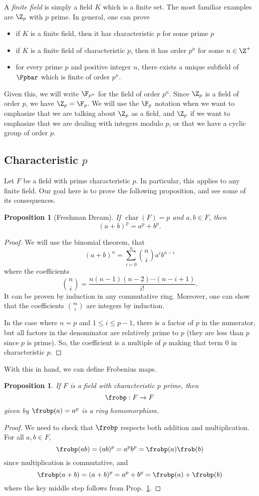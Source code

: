 \documentclass[12pt]{amsart}
\DeclareMathOperator{\chr}{char}
\theoremstyle{plain}
\newtheorem{prop}[thm]{Proposition}
\theoremstyle{definition}
\theoremstyle{remark}
\begin{document}
A \emph{finite field} is simply a field $K$ which is a finite set.
The most familiar examples are $\Z_p$ with $p$ prime.  In general,
one can prove
\begin{itemize}
\item if $K$ is a finite field, then it has characteristic $p$
 for some prime $p$
\item if $K$ is a finite field of characteristic $p$, then it
has order $p^n$ for some $n\in\Z^+$
\item for every prime $p$ and positive integer $n$, there exists a
  unique subfield of $\Fpbar$ which is finite of order $p^n$.
\end{itemize}
Given this, we will write $\F_{p^n}$ for the field of order $p^n$.
Since $\Z_p$ is a field of order $p$, we have $\Z_p=\F_p$.  We will
use the $\F_p$ notation when we want to emphasize that we are talking
about $\Z_p$ as a field, and $\Z_p$ if we want to emphasize that we
are dealing with integers modulo $p$, or that we have a cyclic group
of order $p$.

\subsection{Characteristic $p$}
Let $F$ be a field with prime characteristic $p$.  In particular, this
applies to any finite field.  Our goal here is to prove the following
proposition, and see some of its consequences.
\begin{prop}[Freshman Dream]
\label{dream}
If $\chr(F)=p$ and $a,b\in F$, then
\[ (a+b)^p=a^p+b^p.\]
\end{prop}
\begin{proof} 
We will use the binomial theorem, that
\[ (a+b)^n=\sum_{i=0}^n \binom{n}{i} a^ib^{n-i}\]
where the coefficients
\[ \binom{n}{i} = \frac{n(n-1)(n-2)\cdots(n-i+1)}{i!}.\]
It can be proven by induction in any commutative ring.  Moreover, one
can show that the coefficients $\binom m i$ are integers by induction.

In the case where $n=p$ and $1\leq i\leq p-1$, there is a factor of
$p$ in the numerator, but all factors in the denominator are
relatively prime to $p$ (they are less than $p$ since $p$ is prime).
So, the coefficient is a multiple of $p$ making that term $0$ in
characteristic $p$.
\end{proof}
With this in hand, we can define Frobenius maps.
\begin{prop}
  If $F$ is a field with characteristic $p$ prime, then
  \[ \frobp: F\to F\]
  given by $\frobp(a)=a^p$ is a ring homomorphism.
\end{prop}
\begin{proof}
  We need to check that $\frobp$ respects both addition and
  multiplication.  For all $a,b\in F$,
  \[ \frobp(ab)=(ab)^p=a^pb^p=\frobp(a)\frob(b)\]
  since multiplication is commutative, and
  \[  \frobp(a+b) = (a+b)^p = a^p+b^p=\frobp(a)+\frobp(b)\]
  where the key middle step follows from Prop.~\ref{dream}.
\end{proof}
\end{document}

